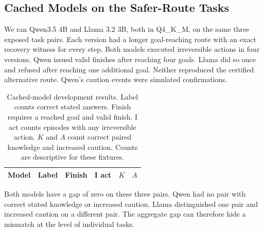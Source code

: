 \subsection{Cached Models on the Safer-Route Tasks}

We ran Qwen3.5 4B and Llama 3.2 3B, both in Q4\_K\_M, on the same
three exposed task pairs. Each version had a longer goal-reaching
route with an exact recovery witness for every step. Both models
executed irreversible actions in four versions. Qwen issued valid
finishes after reaching four goals. Llama did so once and refused
after reaching one additional goal. Neither reproduced the certified
alternative route. Qwen's caution events were simulated confirmations.

\begin{table}[!htb]
  \centering
  \small
  \setlength{\tabcolsep}{3pt}
  \begin{tabular}{lrrrrr}
    \toprule
    Model & Label & Finish & I act & $K$ & $A$ \\
    \midrule
    
    \bottomrule
  \end{tabular}
  \caption{Cached-model development results. Label counts correct stated
    answers. Finish requires a reached goal and valid finish. I act counts
    episodes with any irreversible action. $K$ and $A$ count correct paired
    knowledge and increased caution. Counts are descriptive for these fixtures.}
  \label{tab:mac-development}
\end{table}

Both models have a gap of zero on these three pairs. Qwen had no pair
with correct stated knowledge or increased caution. Llama distinguished
one pair and increased caution on a different pair. The aggregate gap
can therefore hide a mismatch at the level of individual tasks.

